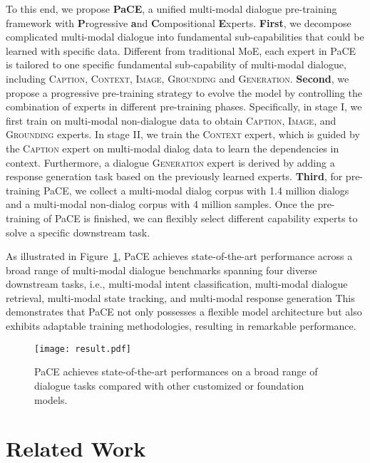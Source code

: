 \documentclass[11pt]{article}
\begin{document}
To this end, we propose \textbf{PaCE}, a unified multi-modal dialogue pre-training framework with
\textbf{P}rogressive \textbf{a}nd \textbf{C}ompositional \textbf{E}xperts. 
\textbf{First}, we decompose complicated multi-modal dialogue into fundamental sub-capabilities that could be learned with specific data.
Different from traditional MoE, each expert in PaCE is tailored to one specific fundamental sub-capability of multi-modal dialogue, including \textsc{Caption}, \textsc{Context}, \textsc{Image}, \textsc{Grounding} and \textsc{Generation}.
\textbf{Second}, we propose a progressive pre-training strategy to evolve the model by controlling the combination of experts in different pre-training phases. 
Specifically, in stage I, we first train on multi-modal non-dialogue data to obtain \textsc{Caption}, \textsc{Image}, and \textsc{Grounding} experts. In stage II, we train the \textsc{Context} expert, which is guided by the \textsc{Caption} expert on multi-modal dialog data to learn the dependencies in context. 
Furthermore, a dialogue \textsc{Generation} expert is derived by adding a response generation task based on the previously learned experts. 
\textbf{Third}, for pre-training PaCE, we collect a multi-modal dialog corpus with 1.4 million dialogs and a multi-modal non-dialog corpus with 4 million samples. Once the pre-training of PaCE is finished, we can flexibly select different capability experts to solve a specific downstream task.

As illustrated in Figure~\ref{fig:result}, PaCE achieves state-of-the-art performance across a broad range of multi-modal dialogue benchmarks spanning four diverse downstream tasks, i.e., multi-modal intent classification, multi-modal dialogue retrieval, multi-modal state tracking, and multi-modal response generation This demonstrates that PaCE not only possesses a flexible model architecture but also exhibits adaptable training methodologies, resulting in remarkable performance.

\begin{figure}[t!]
    \small
    \centering
    \texttt{[image: result.pdf]}
    \caption{PaCE achieves state-of-the-art performances on a broad range of dialogue tasks compared with other customized or foundation models. }
    \label{fig:result}
\end{figure}

\section{Related Work}
\end{document}
